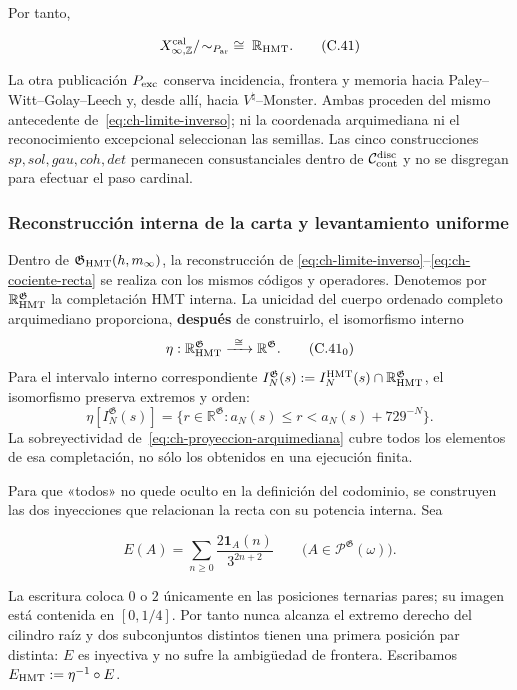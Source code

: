 Por tanto,

\[
 X_{\infty,\mathbb Z}^{\rm cal}/\!\sim_{P_{\rm ar}}
 \;\cong\;\mathbb R_{\rm HMT}.
\tag{C.41}\label{eq:ch-cociente-recta}
\]

La otra publicación \(P_{\rm exc}\) conserva incidencia, frontera y memoria
hacia Paley--Witt--Golay--Leech y, desde allí, hacia
\(V^\natural\)--Monster. Ambas proceden del
mismo antecedente de~\eqref{eq:ch-limite-inverso}; ni la coordenada arquimediana ni el reconocimiento
excepcional seleccionan las semillas. Las cinco construcciones
\(sp,sol,gau,coh,det\) permanecen consustanciales dentro de
\(\mathcal C_{\rm cont}^{\rm disc}\) y no se disgregan para efectuar el paso
cardinal.



\subsubsection{Reconstrucción interna de la carta y levantamiento uniforme}

Dentro de \(\mathfrak G_{\rm HMT}(h,m_\infty)\), la reconstrucción de
\eqref{eq:ch-limite-inverso}--\eqref{eq:ch-cociente-recta} se realiza con los mismos códigos y operadores. Denotemos por
\(\mathbb R_{\rm HMT}^{\mathfrak G}\) la completación HMT interna. La
unicidad del cuerpo ordenado completo arquimediano proporciona, \textbf{después} de
construirlo, el isomorfismo interno
\[
 \eta:\mathbb R_{\rm HMT}^{\mathfrak G}
 \xrightarrow{\ \cong\ }\mathbb R^{\mathfrak G}.
\tag{C.41$_0$}\label{eq:ch-isomorfismo-interno}
\]
Para el intervalo interno correspondiente
\(I_N^{\mathfrak G}(s):=
 I_N^{\rm HMT}(s)\cap\mathbb R_{\rm HMT}^{\mathfrak G}\), el isomorfismo
preserva extremos y orden:
\[
 \eta[I_N^{\mathfrak G}(s)]
 =\{r\in\mathbb R^{\mathfrak G}:
      a_N(s)\le r<a_N(s)+729^{-N}\}.
\tag{C.41$_0$a}\label{eq:ch-intervalos-internos}
\]
La sobreyectividad de~\eqref{eq:ch-proyeccion-arquimediana} cubre todos los elementos de esa completación, no
sólo los obtenidos en una ejecución finita.

Para que «todos» no quede oculto en la definición del codominio, se construyen
las dos inyecciones que relacionan la recta con su potencia interna. Sea

\[
 E(A)=\sum_{n\ge0}\frac{2\mathbf1_A(n)}{3^{2n+2}}
 \qquad
 \bigl(A\in\mathcal P^{\mathfrak G}(\omega)\bigr).
\tag{C.41a}\label{eq:ch-incrustacion-cantor}
\]

La escritura coloca \(0\) o \(2\) únicamente en las posiciones ternarias
pares; su imagen está contenida en \([0,1/4]\). Por tanto nunca alcanza el
extremo derecho del cilindro raíz y dos subconjuntos distintos tienen una
primera posición par distinta: \(E\) es inyectiva y no sufre la ambigüedad de
frontera. Escribamos \(E_{\rm HMT}:=\eta^{-1}\circ E\).

